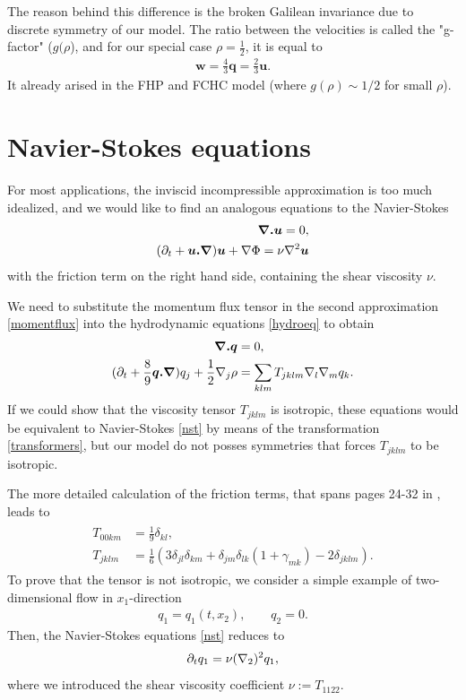 The reason behind this difference is the broken Galilean invariance due to discrete symmetry of our model.
The ratio between the velocities is called the "g-factor" ($g(\rho$), and for our special case $\rho=\frac{1}{2}$, it is equal to
\begin{align}
\bm{w} = \frac{4}{3} \bm{q} = \frac{2}{3} \bm{u}.
\end{align}
It already arised in the FHP and FCHC model (where $g(\rho) \sim 1/2$ for small $\rho$).

\section{Navier-Stokes equations}
For most applications, the inviscid incompressible approximation is too much idealized,
and we would like to find an analogous equations to the Navier-Stokes
\begin{align} \label{nst}
\begin{split}
\bm{\nabla . u} = 0, \\
(\partial_t + \bm{u.\nabla})\bm{u} + \nabla \Phi = \nu \nabla^2 \bm{u}
\end{split}
\end{align}
with the friction term on the right hand side, containing the shear viscosity $\nu$.

We need to substitute the momentum flux tensor in the second approximation \ref{momentflux} into the hydrodynamic equations \ref{hydroeq} to obtain
\begin{align}
\begin{split}
\bm{\nabla . q} &= 0,\\ 
(\partial_t + \frac{8}{9} \bm{q . \nabla}) q_j + \frac{1}{2}\nabla_j\rho &= \sum_{klm} T_{jklm}\nabla_l \nabla_m q_k.
\end{split}
\end{align}
If we could show that the viscosity tensor $T_{jklm}$ is isotropic, these equations would be equivalent to Navier-Stokes \ref{nst} by means of the transformation \ref{transformers}, but our model do not posses symmetries that forces $T_{jklm}$ to be isotropic.

The more detailed calculation of the friction terms, that spans pages 24-32 in \cite{nasilowski}, leads to
\begin{align} \label{vistens}
\begin{split}
T_{00km} &= \frac{1}{9} \delta_{kl}, \\
T_{jklm} &= \frac{1}{6} (3 \delta_{jl}\delta_{km} + \delta_{jm} \delta_{lk}(1 + \gamma_{mk}) - 2 \delta_{jklm}).
\end{split}
\end{align}
To prove that the tensor is not isotropic, we consider a simple example of two-dimensional flow in $x_1$-direction
\begin{align}
q_1 = q_1(t,x_2), \qquad q_2 = 0.
\end{align}
Then, the Navier-Stokes equations \ref{nst} reduces to 
\begin{align}
\partial_t q_1 = \nu (\nabla_2)^2 q_1,
\end{align}
where we introduced the shear viscosity coefficient $\nu := T_{1122}$.

